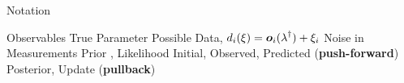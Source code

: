 \begin{block}{Notation}
\centering
\large
    \begin{itemize}
         Observables
        \itembox{$\param^\dagger\in\pspace$} True Parameter
         Possible Data, $d_i(\operatorname*{\xi}) = \boldsymbol{o}_i(\operatorname*{\lambda}^\dagger) + \xi_i$
        \itembox{$\noise^\dagger\in\nspace$} Noise in Measurements
        \itembox{$  \prior ,\; \likelihood  $} Prior , Likelihood
        \itembox{$  \initial ,\; \observed ,\; \predicted $} Initial, Observed, Predicted (\textbf{push-forward})
        \itembox{$   \posterior,\; \updated  $} Posterior, Update (\textbf{pullback})
        
    \end{itemize}

\end{block}